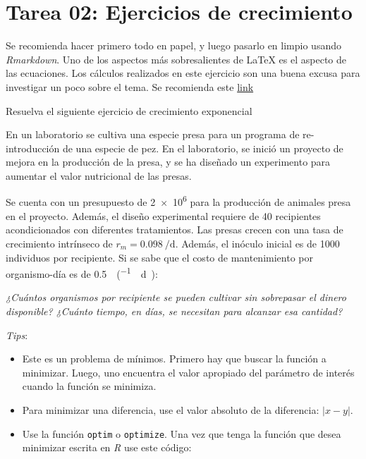 \documentclass[12pt,letterpaper,]{book}
\let\BeginKnitrBlock\begin \let\EndKnitrBlock\end
\begin{document}
\newpage

\section{Tarea 02: Ejercicios de
crecimiento}\label{tarea-02-ejercicios-de-crecimiento}

Se recomienda hacer primero todo en papel, y luego pasarlo en limpio
usando \emph{Rmarkdown}. Uno de los aspectos más sobresalientes de LaTeX
es el aspecto de las ecuaciones. Los cálculos realizados en este
ejercicio son una buena excusa para investigar un poco sobre el tema. Se
recomienda este
\href{https://en.wikibooks.org/wiki/LaTeX/Mathematics}{link}

\setcounter{exercise}{0}

\BeginKnitrBlock{exercise}
\protect\hypertarget{exr:T02E01}{}{\label{exr:T02E01} }Resuelva el siguiente
ejercicio de crecimiento exponencial
\EndKnitrBlock{exercise}

En un laboratorio se cultiva una especie presa para un programa de
re-introducción de una especie de pez. En el laboratorio, se inició un
proyecto de mejora en la producción de la presa, y se ha diseñado un
experimento para aumentar el valor nutricional de las presas.

Se cuenta con un presupuesto de \SI{2e6}{} para la producción
de animales presa en el proyecto. Además, el diseño experimental
requiere de 40 recipientes acondicionados con diferentes tratamientos.
Las presas crecen con una tasa de crecimiento intrínseco de
\(r_m = \SI{0.098}{\per\day}\). Además, el inóculo inicial es de
\num{1000} individuos por recipiente. Si se sabe que el costo de
mantenimiento por organismo-día es de
\SI{0.5}{\per(.\day)}:

\emph{¿Cuántos organismos por recipiente se pueden cultivar sin
sobrepasar el dinero disponible? ¿Cuánto tiempo, en días, se necesitan
para alcanzar esa cantidad?}

\emph{Tips}:

\begin{itemize}
\item
  Este es un problema de mínimos. Primero hay que buscar la función a
  minimizar. Luego, uno encuentra el valor apropiado del parámetro de
  interés cuando la función se minimiza.
\item
  Para minimizar una diferencia, use el valor absoluto de la diferencia:
  \(\left| x - y\right|\).
\item
  Use la función \texttt{optim} o \texttt{optimize}. Una vez que tenga
  la función que desea minimizar escrita en \emph{R} use este código:
\end{itemize}
\end{document}
